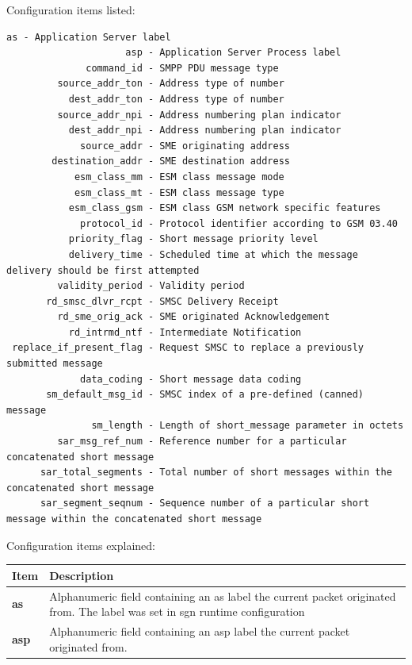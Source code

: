 \documentclass[a4paper,latin]{paper}
\begin{document}
\noindent{}Configuration items listed:
\begin{lstlisting}[style=BashInputStyle, belowskip=\baselineskip]
                      as - Application Server label
                     asp - Application Server Process label
              command_id - SMPP PDU message type
         source_addr_ton - Address type of number
           dest_addr_ton - Address type of number
         source_addr_npi - Address numbering plan indicator
           dest_addr_npi - Address numbering plan indicator
             source_addr - SME originating address
        destination_addr - SME destination address
            esm_class_mm - ESM class message mode
            esm_class_mt - ESM class message type
           esm_class_gsm - ESM class GSM network specific features
             protocol_id - Protocol identifier according to GSM 03.40
           priority_flag - Short message priority level
           delivery_time - Scheduled time at which the message delivery should be first attempted
         validity_period - Validity period
       rd_smsc_dlvr_rcpt - SMSC Delivery Receipt
         rd_sme_orig_ack - SME originated Acknowledgement
           rd_intrmd_ntf - Intermediate Notification
 replace_if_present_flag - Request SMSC to replace a previously submitted message
             data_coding - Short message data coding
       sm_default_msg_id - SMSC index of a pre-defined (canned) message
               sm_length - Length of short_message parameter in octets
         sar_msg_ref_num - Reference number for a particular concatenated short message
      sar_total_segments - Total number of short messages within the concatenated short message
      sar_segment_seqnum - Sequence number of a particular short message within the concatenated short message
\end{lstlisting}
\noindent{}Configuration items explained:\\
\begin{tabularx}{\textwidth}{ | l | X |}
	\hline
	Item	 								& Description \\
	\hline
	\textbf{as}								& Alphanumeric field containing an \acrfull{as} label the current packet originated from. 
						  				  The label was set in \acrfull{sgn} runtime configuration \\ 
	\textbf{asp}								& Alphanumeric field containing an \acrfull{asp} label the current packet originated from. \\
	\hline
\end{tabularx}
\clearpage
\end{document}
